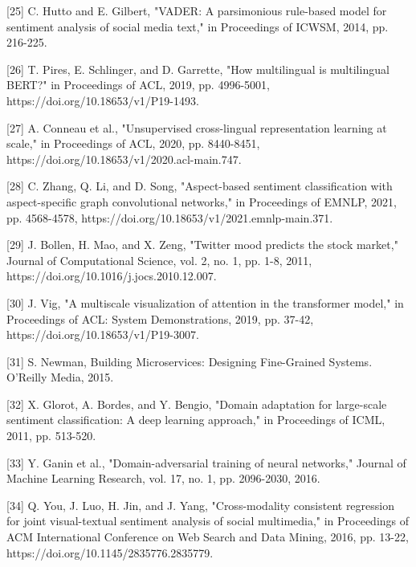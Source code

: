 \documentclass[11pt,a4paper]{article}
\begin{document}
[25] C. Hutto and E. Gilbert, "VADER: A parsimonious rule-based model for sentiment analysis of social media text," in Proceedings of ICWSM, 2014, pp. 216-225.

[26] T. Pires, E. Schlinger, and D. Garrette, "How multilingual is multilingual BERT?" in Proceedings of ACL, 2019, pp. 4996-5001, https://doi.org/10.18653/v1/P19-1493.

[27] A. Conneau et al., "Unsupervised cross-lingual representation learning at scale," in Proceedings of ACL, 2020, pp. 8440-8451, https://doi.org/10.18653/v1/2020.acl-main.747.

[28] C. Zhang, Q. Li, and D. Song, "Aspect-based sentiment classification with aspect-specific graph convolutional networks," in Proceedings of EMNLP, 2021, pp. 4568-4578, https://doi.org/10.18653/v1/2021.emnlp-main.371.

[29] J. Bollen, H. Mao, and X. Zeng, "Twitter mood predicts the stock market," Journal of Computational Science, vol. 2, no. 1, pp. 1-8, 2011, https://doi.org/10.1016/j.jocs.2010.12.007.

[30] J. Vig, "A multiscale visualization of attention in the transformer model," in Proceedings of ACL: System Demonstrations, 2019, pp. 37-42, https://doi.org/10.18653/v1/P19-3007.

[31] S. Newman, Building Microservices: Designing Fine-Grained Systems. O'Reilly Media, 2015.

[32] X. Glorot, A. Bordes, and Y. Bengio, "Domain adaptation for large-scale sentiment classification: A deep learning approach," in Proceedings of ICML, 2011, pp. 513-520.

[33] Y. Ganin et al., "Domain-adversarial training of neural networks," Journal of Machine Learning Research, vol. 17, no. 1, pp. 2096-2030, 2016.

[34] Q. You, J. Luo, H. Jin, and J. Yang, "Cross-modality consistent regression for joint visual-textual sentiment analysis of social multimedia," in Proceedings of ACM International Conference on Web Search and Data Mining, 2016, pp. 13-22, https://doi.org/10.1145/2835776.2835779.
\end{document}
